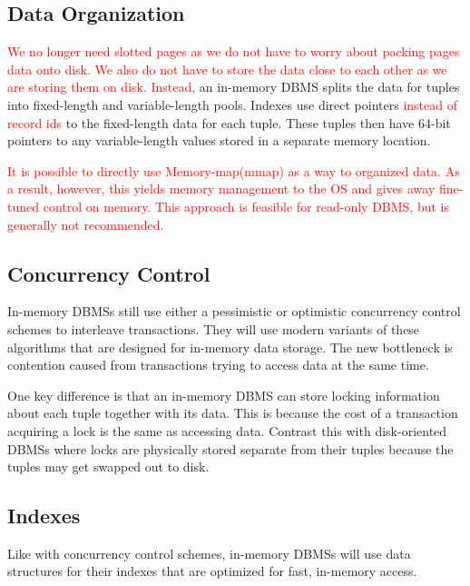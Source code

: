 \documentclass[11pt]{article}
\newcommand{\rr}[1]{\textcolor{red}{#1}}
\begin{document}
\subsection*{Data Organization}
\rr{We no longer need slotted pages as we do not have to worry about packing pages data onto disk. We also do not have to store the data close to each other as we are storing them on disk. Instead,} an in-memory DBMS splits the data for tuples into fixed-length and variable-length pools. Indexes 
use direct pointers \rr{instead of record ids} to the fixed-length data for each tuple. These tuples then have 64-bit pointers to any 
variable-length values stored in a separate memory location.

\rr{It is possible to directly use Memory-map(mmap) as a way to organized data. As a result, however, this yields 
memory management to the OS and gives away fine-tuned control on memory. This approach is feasible for read-only DBMS, but is generally not recommended.}
    
\subsection*{Concurrency Control}
In-memory DBMSs still use either a pessimistic or optimistic concurrency control 
schemes to interleave transactions. They will use modern variants of these algorithms that are 
designed for in-memory data storage.
The new bottleneck is contention caused from transactions trying to access data at the 
same time.

One key difference is that an in-memory DBMS can store locking information about each tuple 
together with its data. This is because the cost of a transaction acquiring a lock is 
the same as accessing data. Contrast this with disk-oriented DBMSs where locks are physically 
stored separate from their tuples because the tuples may get swapped out to disk.

\subsection*{Indexes}
Like with concurrency control schemes, in-memory DBMSs will use data structures for their indexes 
that are optimized for fast, in-memory access.
\end{document}
